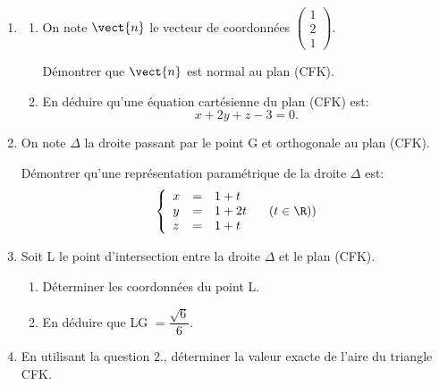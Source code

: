 \begin{enumerate}[start=3]
\item 
	\begin{enumerate}
		\item On note $\vect{n}$ le vecteur de coordonnées $\begin{pmatrix}1\\2\\1\end{pmatrix}$.
		
Démontrer que $\vect{n}$ est normal au plan (CFK).
		\item  En déduire qu'une équation cartésienne du plan (CFK) est:
\[x + 2y + z - 3 = 0.\]
	\end{enumerate}
\item On note $\Delta$ la droite passant par le point G et orthogonale au plan (CFK). 

Démontrer qu'une représentation paramétrique de la droite $\Delta$ est:
\[\left\{\begin{array}{l c l}
x&=&1 + t\\
y&=&1 + 2t\\
z&=&1 + t
\end{array}\right. \quad  (t \in \R))\]
\item Soit L le point d'intersection entre la droite $\Delta$ et le plan (CFK).
	\begin{enumerate}
		\item Déterminer les coordonnées du point L.
		\item En déduire que LG $= \dfrac{\sqrt 6}{6}$.
	\end{enumerate}
\item En utilisant la question 2., déterminer la valeur exacte de l'aire du triangle CFK.
\end{enumerate}

\bigskip
